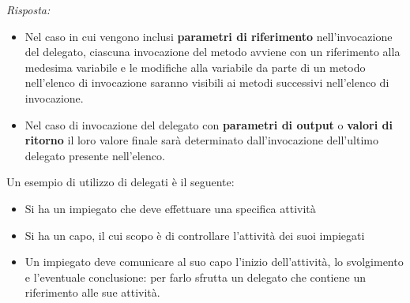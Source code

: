 \documentclass{article}
\newenvironment{solution}
    {\textit{Risposta:}}
    {}
\begin{document}
\begin{solution}
\begin{itemize}
	\item Nel caso in cui vengono inclusi \textbf{parametri di riferimento} nell'invocazione del delegato, ciascuna invocazione del metodo avviene con un riferimento alla medesima variabile e le modifiche alla variabile da parte di un metodo nell'elenco di invocazione saranno visibili ai metodi successivi nell'elenco di invocazione.
	\item Nel caso di invocazione del delegato con \textbf{parametri di output} o \textbf{valori di ritorno} il loro valore finale sarà determinato dall'invocazione dell'ultimo delegato presente nell'elenco.
\end{itemize}
Un esempio di utilizzo di delegati è il seguente:
\begin{itemize}
	\item Si ha un impiegato che deve effettuare una specifica attività
	\item Si ha un capo, il cui scopo è di controllare l'attività dei suoi impiegati
	\item Un impiegato deve comunicare al suo capo l'inizio dell'attività, lo svolgimento e l'eventuale conclusione: per farlo sfrutta un delegato che contiene un riferimento alle sue attività.
\end{itemize}
\end{solution}
\end{document}

